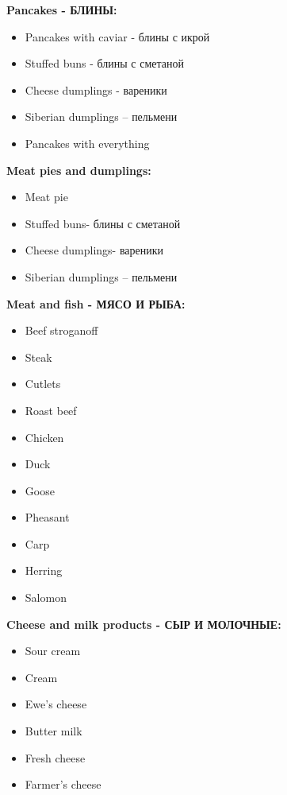 \documentclass[
	12pt, %
]{fphw}
\begin{document}
\textbf{Pancakes - \foreignlanguage{russian}{БЛИНЫ}:}

\begin{itemize}
	\item Pancakes with caviar - \foreignlanguage{russian}{блины с икрой}
	\item Stuffed buns - \foreignlanguage{russian}{блины с сметаной}
	\item Cheese dumplings - \foreignlanguage{russian}{вареники}
	\item Siberian dumplings – \foreignlanguage{russian}{пельмени}
	\item Pancakes with everything
\end{itemize}

\textbf{Meat pies and dumplings:}

\begin{itemize}
	\item Meat pie
	\item Stuffed buns- \foreignlanguage{russian}{блины с сметаной}
	\item Cheese dumplings- \foreignlanguage{russian}{вареники}
	\item Siberian dumplings – \foreignlanguage{russian}{пельмени}
\end{itemize}

\textbf{Meat and fish - \foreignlanguage{russian}{МЯСО И РЫБА}:}

\begin{itemize}
	\item Beef stroganoff
	\item Steak
	\item Cutlets
	\item Roast beef
	\item Chicken
	\item Duck
	\item Goose
	\item Pheasant
	\item Carp
	\item Herring
	\item Salomon
\end{itemize}

\textbf{Cheese and milk products - \foreignlanguage{russian}{СЫР И МОЛОЧНЫЕ}:}

\begin{itemize}
	\item Sour cream
	\item Cream
	\item Ewe’s cheese
	\item Butter milk
	\item Fresh cheese
	\item Farmer’s cheese
\end{itemize}
\end{document}
